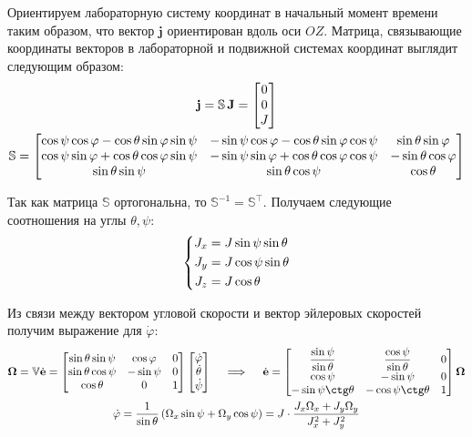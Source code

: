\documentclass[12pt]{article}
\newcommand{\bbS}{\mathbb{S}}
\newcommand{\bfj}{\mathbf{j}}
\newcommand{\bfJ}{\mathbf{J}}
\begin{document}
Ориентируем лабораторную систему координат в начальный момент времени таким образом, что вектор $\bfj$ ориентирован вдоль оси $OZ$. Матрица, связывающие координаты векторов в лабораторной и подвижной системах координат выглядит следующим образом: 
\begin{gather}
\bfj = \bbS \, \bfJ = 
\begin{bmatrix}
0 \\
0 \\
J
\end{bmatrix} \notag \\
\bbS = 
\begin{bmatrix} 
\cos \psi \cos \varphi - \cos \theta \sin \varphi \sin \psi & - \sin \psi \cos \varphi - \cos \theta \sin \varphi \cos \psi & \sin \theta \sin \varphi \\ \cos \psi \sin \varphi + \cos \theta \cos \varphi \sin \psi & - \sin \psi \sin \varphi + \cos \theta \cos \varphi \cos \psi & - \sin \theta \cos \varphi \\ \sin \theta \sin \psi & \sin \theta \cos \psi & \cos \theta 
\end{bmatrix} \notag
\end{gather}

Так как матрица $\bbS$ ортогональна, то $\bbS^{-1} = \bbS^\top$. Получаем следующие соотношения на углы $\theta, \psi$:
\begin{gather}
\left\{
\begin{aligned}
J_x &= J \sin \psi \sin \theta \\
J_y &= J \cos \psi \sin \theta \\
J_z &= J \cos \theta
\end{aligned}
\right. \notag
\end{gather}

Из связи между вектором угловой скорости и вектор эйлеровых скоростей получим выражение для $\dot{\varphi}$:
\begin{gather}
\mathbf{\Omega} = \mathbb{V} \dot{\mathbf{e}} = 
\begin{bmatrix}
\sin \theta \sin \psi & \cos \varphi & 0 \\
\sin \theta \cos \psi & - \sin \psi & 0 \\
\cos \theta & 0 & 1
\end{bmatrix}
\begin{bmatrix}
\dot{\varphi} \\
\dot{\theta} \\
\dot{\psi}
\end{bmatrix} 
\quad \implies \quad
\dot{\mathbf{e}} = 
\begin{bmatrix}
\displaystyle \frac{\sin \psi}{\sin \theta} & \displaystyle \frac{\cos \psi}{\sin \theta} & 0 \\
\cos \psi & - \sin \psi & 0 \\
- \sin \psi \ctg \theta & - \cos \psi \ctg \theta & 1 
\end{bmatrix}
\mathbf{\Omega} \notag \\
\dot{\varphi} = \frac{1}{\sin \theta} \left( \Omega_x \sin \psi + \Omega_y \cos \psi \right) = J \cdot \frac{J_x \Omega_x + J_y \Omega_y}{J_x^2 + J_y^2} \notag
\end{gather}
\end{document}
